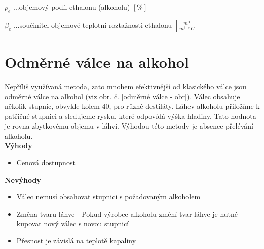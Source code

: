 \(p_e\) ...objemový podíl ethalonu (alkoholu) \([\%]\) 

\(\beta_e\) ...součinitel objemové teplotní roztažnosti ethalonu \([\frac{m^3}{m^3 \cdot ^\circ C}]\)




\section{Odměrné válce na alkohol}
\label{valec_na_alkohol}

Nepříliš využívaná metoda, zato mnohem efektivnější od klasického válce jsou odměrné válce na alkohol (viz obr. č. \ref{odměrné válce - obr}). Válec obsahuje několik stupnic, obvykle kolem 40, pro různé destiláty. Láhev alkoholu přiložíme k patřičné stupnici a sledujeme rysku, které odpovídá výška hladiny. Tato hodnota je rovna zbytkovému objemu v láhvi. Výhodou této metody je absence přelévání alkoholu.\\



\textbf{Výhody}
\begin{itemize}
    \item Cenová dostupnost\\
\end{itemize}

\textbf{Nevýhody}
\begin{itemize}
    \item Válec nemusí obsahovat stupnici s požadovaným alkoholem
    \item Změna tvaru láhve - Pokud výrobce alkoholu změní tvar láhve je nutné kupovat nový válec s novou stupnicí
    \item Přesnost je závislá na teplotě kapaliny
\end{itemize}

